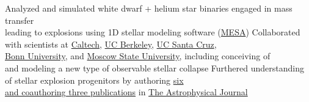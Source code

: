 \documentclass[letterpaper,MMMyyyy,nonstopmode]{simpleresumecv}
\begin{document}
\begin{Body}
\begin{Detail}
\begin{Detail}
\begin{Detail}
\BulletItem
Analyzed and simulated white dwarf + helium star binaries engaged in mass transfer \\leading to explosions using 1D stellar modeling software (\href{http://mesa.sourceforge.net/}{MESA})
\BulletItem
Collaborated with scientists at \href{https://www.caltech.edu/}{Caltech}, \href{https://www.berkeley.edu/}{UC Berkeley}, \href{https://www.ucsc.edu}{UC Santa Cruz}, \\\href{https://www.uni-bonn.de/}{Bonn University}, and \href{https://www.msu.ru/en/}{Moscow State University}, including conceiving of \\and modeling a new type of observable stellar collapse
\BulletItem
Furthered understanding of stellar explosion progenitors by authoring \href{http://adsabs.harvard.edu/cgi-bin/nph-abs_connect?library&libname=MyPapers&libid=561872b258}{six \\ and coauthoring three publications} in \href{http://iopscience.iop.org/journal/0004-637X}{The Astrophysical Journal}
\vspace{1mm}











\end{Detail}
\end{Detail}
\end{Detail}
\end{Body}
\end{document}
